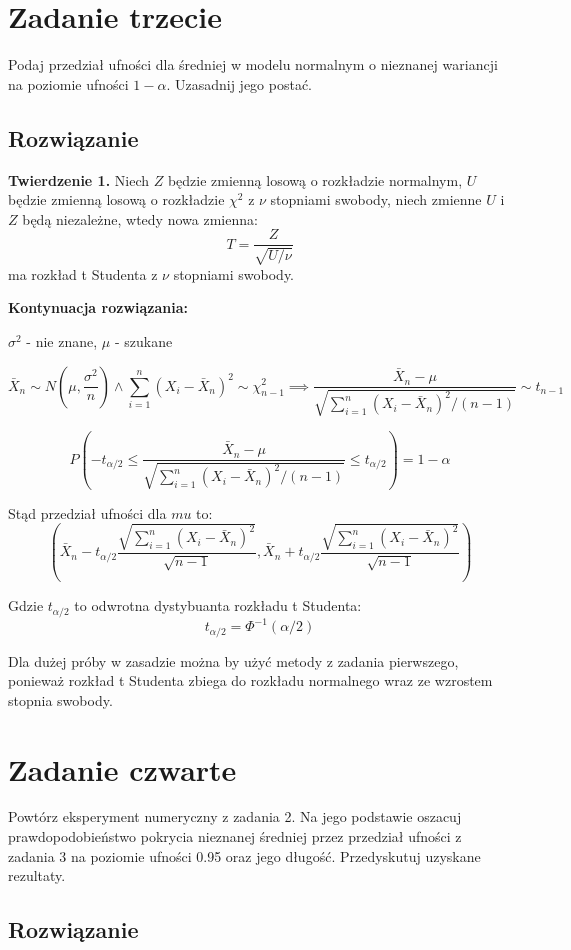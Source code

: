 \documentclass[a4paper]{article}
\begin{document}
\section{Zadanie trzecie}
Podaj przedział ufności dla średniej w modelu normalnym o nieznanej wariancji na poziomie ufności $1-\alpha$. Uzasadnij jego postać.

\subsection{Rozwiązanie}
\textbf{Twierdzenie 1.}
Niech $Z$ będzie zmienną losową o rozkładzie normalnym, $U$ będzie zmienną losową o rozkładzie $\chi^2$ z $\nu$ stopniami swobody, niech zmienne $U$ i $Z$ będą niezależne, wtedy nowa zmienna:
$$T=\frac{Z}{\sqrt{U/\nu}}$$
ma rozkład t Studenta z $\nu$ stopniami swobody.

\textbf{Kontynuacja rozwiązania:}



$\sigma^2$ - nie znane, $\mu$ - szukane

$$\bar{X}_n\sim N(\mu,\frac{\sigma^2}{n})\land\sum_{i=1}^n(X_i-\bar{X}_n)^2\sim\chi_{n-1}^2\implies\frac{\bar{X}_n-\mu}{\sqrt{\sum_{i=1}^n(X_i-\bar{X}_n)^2/(n-1)}}\sim t_{n-1}$$

$$P(-t_{\alpha/2}\leq\frac{\bar{X}_n-\mu}{\sqrt{\sum_{i=1}^n(X_i-\bar{X}_n)^2/(n-1)}}\leq t_{\alpha/2})=1-\alpha$$

Stąd przedział ufności dla $mu$ to:
$$(\bar{X}_n-t_{\alpha/2}\frac{\sqrt{\sum_{i=1}^n(X_i-\bar{X}_n)^2}}{\sqrt{n-1}},\bar{X}_n+t_{\alpha/2}\frac{\sqrt{\sum_{i=1}^n(X_i-\bar{X}_n)^2}}{\sqrt{n-1}})$$

Gdzie $t_{\alpha/2}$ to odwrotna dystybuanta rozkładu t Studenta:
$$t_{\alpha/2}=\Phi^{-1}(\alpha/2)$$

Dla dużej próby w zasadzie można by użyć metody z zadania pierwszego, ponieważ rozkład t Studenta zbiega do rozkładu normalnego wraz ze wzrostem stopnia swobody.


\section{Zadanie czwarte}
Powtórz eksperyment numeryczny z zadania 2. Na jego podstawie oszacuj prawdopodobieństwo pokrycia nieznanej średniej przez przedział ufności z zadania 3 na poziomie ufności 0.95 oraz jego długość. Przedyskutuj uzyskane rezultaty.


\subsection{Rozwiązanie}
\end{document}
